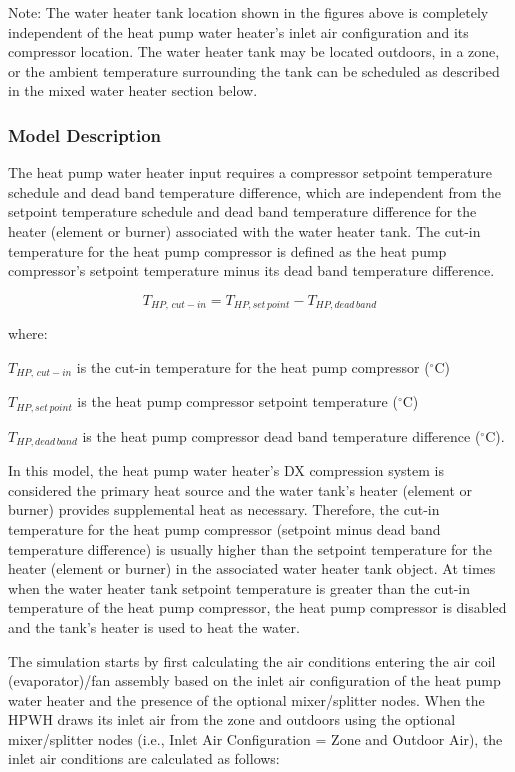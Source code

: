 Note: The water heater tank location shown in the figures above is completely independent of the heat pump water heater's inlet air configuration and its compressor location. The water heater tank may be located outdoors, in a zone, or the ambient temperature surrounding the tank can be scheduled as described in the mixed water heater section below.

\subsubsection{Model Description}\label{model-description-016}

The heat pump water heater input requires a compressor setpoint temperature schedule and dead band temperature difference, which are independent from the setpoint temperature schedule and dead band temperature difference for the heater (element or burner) associated with the water heater tank. The cut-in temperature for the heat pump compressor is defined as the heat pump compressor's setpoint temperature minus its dead band temperature difference.

\begin{equation}
{T_{HP,\,cut - in}} = {T_{HP,set\,point}} - {T_{HP,dead\,band}}
\end{equation}

where:

\({T_{HP,\,cut - in}}\) is the cut-in temperature for the heat pump compressor (\(^{\circ}\)C)

\({T_{HP,set\,point}}\) is the heat pump compressor setpoint temperature (\(^{\circ}\)C)

\({T_{HP,dead\,band}}\) is the heat pump compressor dead band temperature difference (\(^{\circ}\)C).

In this model, the heat pump water heater's DX compression system is considered the primary heat source and the water tank's heater (element or burner) provides supplemental heat as necessary. Therefore, the cut-in temperature for the heat pump compressor (setpoint minus dead band temperature difference) is usually higher than the setpoint temperature for the heater (element or burner) in the associated water heater tank object. At times when the water heater tank setpoint temperature is greater than the cut-in temperature of the heat pump compressor, the heat pump compressor is disabled and the tank's heater is used to heat the water.

The simulation starts by first calculating the air conditions entering the air coil (evaporator)/fan assembly based on the inlet air configuration of the heat pump water heater and the presence of the optional mixer/splitter nodes. When the HPWH draws its inlet air from the zone and outdoors using the optional mixer/splitter nodes (i.e., Inlet Air Configuration = Zone and Outdoor Air), the inlet air conditions are calculated as follows:


